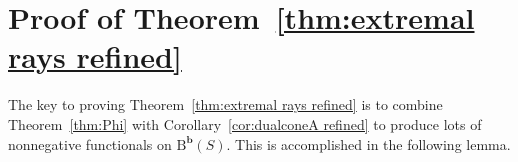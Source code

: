 \documentclass[12pt]{amsart}
\newtheorem{lemma}{Lemma}[section]
\theoremstyle{definition}
\theoremstyle{remark}
\newcommand{\PP}{\mathbb{P}}
\newcommand{\bb}{\mathbf{b}}
\newcommand{\cE}{\mathcal{E}}
\newcommand{\FF}{\mathbf{F}}
\newcommand{\DD}{\mathrm{D}}
\newcommand{\BBQ}{\mathrm{B}}
\begin{document}
\section{Proof of Theorem~\ref{thm:extremal rays refined}}\label{sec:refined}

The key to proving Theorem~\ref{thm:extremal rays refined} is to combine Theorem~\ref{thm:Phi} with Corollary~\ref{cor:dualconeA refined}
to produce lots of nonnegative functionals on $\BBQ^{\bb}(S)$.  This is accomplished in the following lemma.


\end{document}
